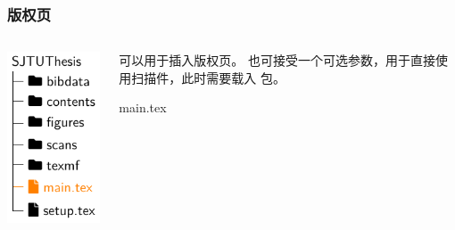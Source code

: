 \begin{frame}[fragile]
  \frametitle{版权页}
  \begin{columns}
    \begin{column}{0.4\textwidth}
      \includegraphics[page=4]{support/figures/thesisdir.pdf}
    \end{column}
    \begin{column}{0.6\textwidth}
       可以用于插入版权页。
      也可接受一个可选参数，用于直接使用扫描件，此时需要载入  包。

      \begin{codeblock}[firstnumber=22]{main.tex}
\copyrightpage
      \end{codeblock}
    \end{column}
  \end{columns}
\end{frame}

